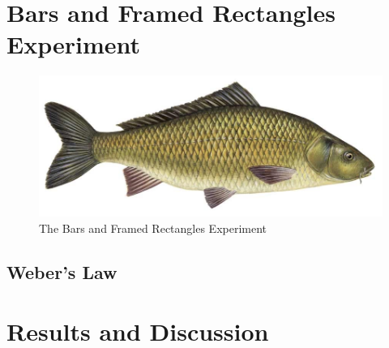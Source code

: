 \documentclass[journal]{vgtc}                %
\begin{document}
\section{Bars and Framed Rectangles Experiment}

\begin{figure}[t]
	  \includegraphics[width=\linewidth]{fish.jpg}
  \caption{The Bars and Framed Rectangles Experiment}
	\label{fig:bars_and_framed_rectangles_experiment}
\end{figure}

\subsection{Weber's Law}

\section{Results and Discussion}
\end{document}
